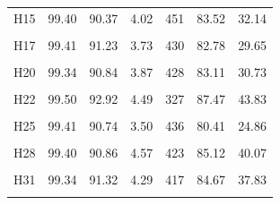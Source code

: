 \documentclass[
  a4paper,
  titlepage]{article}
\begin{document}
\begin{longtable}[t]{lllllll}
H15 & 99.40 & 90.37 & 4.02 & 451 & 83.52 & 32.14\\
 
\cellcolor{gray!6}{H16} & \cellcolor{gray!6}{99.43} & \cellcolor{gray!6}{91.11} & \cellcolor{gray!6}{4.36} & \cellcolor{gray!6}{420} & \cellcolor{gray!6}{85.31} & \cellcolor{gray!6}{38.26}\\
 
H17 & 99.41 & 91.23 & 3.73 & 430 & 82.78 & 29.65\\
 
\cellcolor{gray!6}{H18} & \cellcolor{gray!6}{99.44} & \cellcolor{gray!6}{91.07} & \cellcolor{gray!6}{4.50} & \cellcolor{gray!6}{443} & \cellcolor{gray!6}{87.02} & \cellcolor{gray!6}{41.10}\\
 
H20 & 99.34 & 90.84 & 3.87 & 428 & 83.11 & 30.73\\
 
\cellcolor{gray!6}{H21} & \cellcolor{gray!6}{99.42} & \cellcolor{gray!6}{91.06} & \cellcolor{gray!6}{3.92} & \cellcolor{gray!6}{421} & \cellcolor{gray!6}{82.65} & \cellcolor{gray!6}{30.99}\\
 
H22 & 99.50 & 92.92 & 4.49 & 327 & 87.47 & 43.83\\
 
\cellcolor{gray!6}{H23} & \cellcolor{gray!6}{99.46} & \cellcolor{gray!6}{91.01} & \cellcolor{gray!6}{3.52} & \cellcolor{gray!6}{416} & \cellcolor{gray!6}{79.75} & \cellcolor{gray!6}{24.54}\\
 
H25 & 99.41 & 90.74 & 3.50 & 436 & 80.41 & 24.86\\
 
\cellcolor{gray!6}{H26} & \cellcolor{gray!6}{99.38} & \cellcolor{gray!6}{90.54} & \cellcolor{gray!6}{4.00} & \cellcolor{gray!6}{428} & \cellcolor{gray!6}{83.26} & \cellcolor{gray!6}{31.55}\\
 
H28 & 99.40 & 90.86 & 4.57 & 423 & 85.12 & 40.07\\
 
\cellcolor{gray!6}{H30} & \cellcolor{gray!6}{99.47} & \cellcolor{gray!6}{92.31} & \cellcolor{gray!6}{4.19} & \cellcolor{gray!6}{422} & \cellcolor{gray!6}{84.04} & \cellcolor{gray!6}{37.79}\\
 
H31 & 99.34 & 91.32 & 4.29 & 417 & 84.67 & 37.83\\
 
\cellcolor{gray!6}{H36} & \cellcolor{gray!6}{99.44} & \cellcolor{gray!6}{90.81} & \cellcolor{gray!6}{4.97} & \cellcolor{gray!6}{451} & \cellcolor{gray!6}{87.12} & \cellcolor{gray!6}{46.17}\\
 

\end{longtable}
\end{document}
